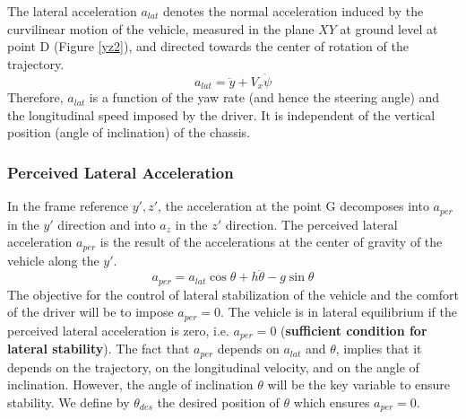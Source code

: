 The lateral acceleration $a_{lat}$ denotes the normal acceleration induced by the curvilinear motion of the vehicle, measured in the plane $XY$ at ground level at point D (Figure \ref{yz2}), and directed towards the center of rotation of the trajectory.
\[a_{lat}=\ddot{y}+V_{x}\dot{\psi}\]
Therefore, $a_{lat}$ is a function of the yaw rate (and hence the steering angle) and the longitudinal speed imposed by the driver. It is independent of the vertical position (angle of inclination) of the chassis.

\subsubsection{\textbf{Perceived Lateral Acceleration}}

In the frame reference $y',z'$, the acceleration at the point G decomposes into $a_{per}$ in the $y'$ direction and into $a_{z}$ in the $z'$ direction. The perceived lateral acceleration $a_{per}$ is the result of the accelerations at the center of gravity of the vehicle along the $y'$. 
\begin{equation}
a_{per}=a_{lat}\cos\theta+h\ddot{\theta}-g\sin\theta
\label{a_per}
\end{equation}
The objective for the control of lateral stabilization of the vehicle and the comfort of the driver will be to impose $a_{per}=0$. The vehicle is in lateral equilibrium if the perceived lateral acceleration is zero, i.e. $a_{per}=0$ (\textbf{sufficient condition for lateral stability})\cite[-2cm]{mourad:tel-00787310}.
\newpage
The fact that $a_{per}$ depends on $a_{lat}$ and $\theta$, implies that it depends on the trajectory, on the longitudinal velocity, and on the angle of inclination. However, the angle of inclination $\theta$ will be the key variable to ensure stability. We define by $\theta_{des}$ the desired position of $\theta$ which ensures $a_{per}=0$. 

